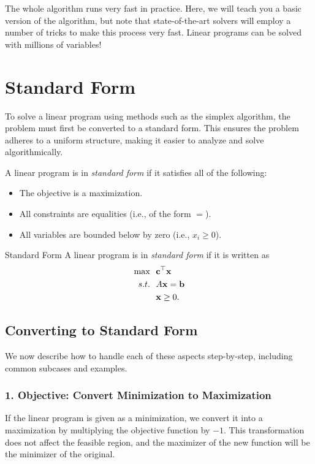 The whole algorithm runs very fast in practice.  Here, we will teach you a basic version of the algorithm, but note that state-of-the-art solvers will employ a number of tricks to make this process very fast.  Linear programs can be solved with millions of variables!

\section{Standard Form}
\label{sec:standard-form}

To solve a linear program using methods such as the simplex algorithm, the problem must first be converted to a standard form. This ensures the problem adheres to a uniform structure, making it easier to analyze and solve algorithmically.

A linear program is in \emph{standard form} if it satisfies all of the following:
\begin{itemize}
    \item The objective is a maximization.
    \item All constraints are equalities (i.e., of the form \( = \)).
    \item All variables are bounded below by zero (i.e., \( x_i \geq 0 \)).
\end{itemize}

\begin{definition}{Standard Form}\label{def:standardform}
A linear program is in \emph{standard form} if it is written as
\begin{align*}
\max \ \ &\mathbf{c}^\top \mathbf{x} \\
s.t. \ \ & A\mathbf{x} = \mathbf{b}\\
& \mathbf{x} \geq 0.
\end{align*}
\end{definition}

\subsection{Converting to Standard Form}
We now describe how to handle each of these aspects step-by-step, including common subcases and examples.

\subsubsection*{1. Objective: Convert Minimization to Maximization}

If the linear program is given as a minimization, we convert it into a maximization by multiplying the objective function by \( -1 \). This transformation does not affect the feasible region, and the maximizer of the new function will be the minimizer of the original.

